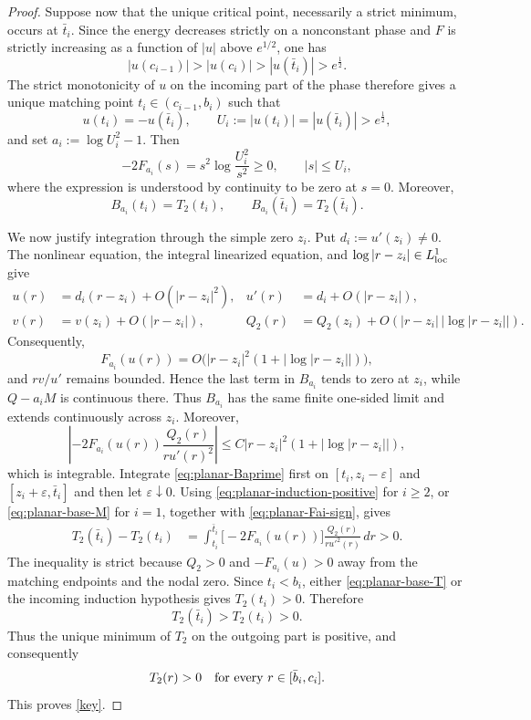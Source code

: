 \documentclass[11pt]{article}
\begin{document}
\begin{proof}
Suppose now that the unique critical point, necessarily a strict minimum,
occurs at $\bar t_i$. Since the energy decreases strictly on a nonconstant
phase and $F$ is strictly increasing as a function of $|u|$ above
$e^{1/2}$, one has
\[
 |u(c_{i-1})|>|u(c_i)|>|u(\bar t_i)|>e^{\frac{1}{2}}.
\]
The strict monotonicity of $u$ on the incoming part of the phase therefore
gives a unique matching point $t_i\in(c_{i-1},b_i)$ such that
\[
 u(t_i)=-u(\bar t_i),
 \qquad
 U_i:=|u(t_i)|=|u(\bar t_i)|>e^{\frac{1}{2}},
\]
and set $a_i:=\log U_i^2-1$. Then
\begin{equation}\label{eq:planar-Fai-sign}
 -2F_{a_i}(s)=s^2\log\frac{U_i^2}{s^2}\geq0,
 \qquad |s|\leq U_i,
\end{equation}
where the expression is understood by continuity to be zero at $s=0$. Moreover,
\[
 B_{a_i}(t_i)=T_2(t_i),
 \qquad
 B_{a_i}(\bar t_i)=T_2(\bar t_i).
\]

We now justify integration through the simple zero $z_i$. Put
$d_i:=u'(z_i)\ne0$. The nonlinear equation, the integral linearized
equation, and $\log|r-z_i|\in L^1_{\rm loc}$ give
\begin{align*}
 u(r)&=d_i(r-z_i)+O(|r-z_i|^2),
 &u'(r)&=d_i+O(|r-z_i|),\\
 v(r)&=v(z_i)+O(|r-z_i|),
 &Q_2(r)&=Q_2(z_i)+O(|r-z_i|\,|\log|r-z_i||).
\end{align*}
Consequently,
\[
 F_{a_i}(u(r))
 =O\bigl(|r-z_i|^2(1+|\log|r-z_i||)\bigr),
\]
and $rv/u'$ remains bounded. Hence the last term in $B_{a_i}$ tends to
zero at $z_i$, while $Q-a_iM$ is continuous there. Thus $B_{a_i}$ has the
same finite one-sided limit and extends continuously across $z_i$. Moreover,
\[
 \left|-2F_{a_i}(u(r))\frac{Q_2(r)}{r u'(r)^2}\right|
 \le C|r-z_i|^2(1+|\log|r-z_i||),
\]
which is integrable. Integrate \eqref{eq:planar-Baprime} first on
$[t_i,z_i-\varepsilon]$ and $[z_i+\varepsilon,\bar t_i]$ and then let
$\varepsilon\downarrow0$. Using
\eqref{eq:planar-induction-positive} for $i\ge2$, or
\eqref{eq:planar-base-M} for $i=1$, together with
\eqref{eq:planar-Fai-sign}, gives
\begin{align*}
 T_2(\bar t_i)-T_2(t_i)
 &=\int_{t_i}^{\bar t_i}
   \bigl[-2F_{a_i}(u(r))\bigr]
   \frac{Q_2(r)}{r u'^2(r)}\,dr>0.
\end{align*}
The inequality is strict because $Q_2>0$ and
$-F_{a_i}(u)>0$ away from the matching endpoints and the nodal zero. Since
$t_i<b_i$, either \eqref{eq:planar-base-T} or the incoming induction
hypothesis gives $T_2(t_i)>0$. Therefore
\[
 T_2(\bar t_i)>T_2(t_i)>0.
\]
Thus the unique minimum of $T_2$ on the outgoing part is positive, and consequently
\begin{equation*}
 T_2(r)>0\quad\hbox{for every }r\in[\bar b_i,c_i].
\end{equation*}
This proves \eqref{key}.


\end{proof}
\end{document}
